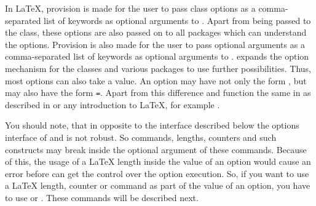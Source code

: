 \begin{Declaration}
\end{Declaration}
In \LaTeX{}, provision is made for the user to pass class options as a
comma-separated list of keywords as optional arguments to
.
Apart from being passed to the class,
these options are also passed on to all packages which can understand
the options. Provision is also made for the user to pass optional
arguments as a comma-separated list of keywords as optional arguments
to .  {\KOMAScript}
expands the
option mechanism for the {\KOMAScript} classes and various packages to
use further possibilities. Thus, most {\KOMAScript} options can also
take a value. An option may have not only the form , but
may also have the form \texttt{=}. Apart
from this difference  and 
function the same in {\KOMAScript} as described in
\cite{latex:usrguide} or any introduction to \LaTeX, for example
\cite{lshort}.%


You should note, that in opposite to the interface
described below the options interface of  and
 is not robust. So commands, lengths, counters and such
constructs may break inside the optional argument of these commands. Because
of this, the usage of a \LaTeX{} length inside the value of an option would
cause an error before \KOMAScript{} can get the control over the option
execution. So, if you want to use a \LaTeX{} length, counter or command as part
of the value of an option, you have to use
 or
. These commands will be described next.%
%
\EndIndexGroup


